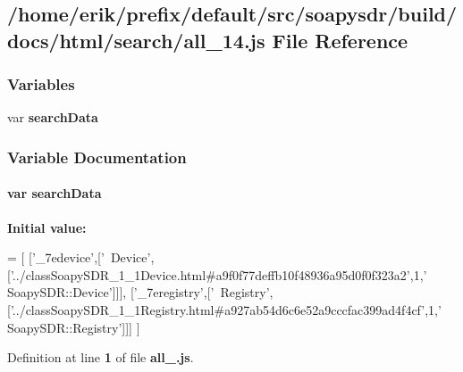 \subsection{/home/erik/prefix/default/src/soapysdr/build/docs/html/search/all\+\_\+14.js File Reference}
\label{all__14_8js}
\subsubsection*{Variables}
\begin{DoxyCompactItemize}
\item 
var {\bf search\+Data}
\end{DoxyCompactItemize}


\subsubsection{Variable Documentation}
\paragraph[{search\+Data}]{\setlength{\rightskip}{0pt plus 5cm}var search\+Data}\label{all__14_8js_ad01a7523f103d6242ef9b0451861231e}
{\bfseries Initial value\+:}
\begin{DoxyCode}
=
[
  [\textcolor{stringliteral}{'\_7edevice'},[\textcolor{stringliteral}{'~Device'},[\textcolor{stringliteral}{'../classSoapySDR\_1\_1Device.html#a9f0f77deffb10f48936a95d0f0f323a2'},1,\textcolor{stringliteral}{'
      SoapySDR::Device'}]]],
  [\textcolor{stringliteral}{'\_7eregistry'},[\textcolor{stringliteral}{'~Registry'},[\textcolor{stringliteral}{'../classSoapySDR\_1\_1Registry.html#a927ab54d6c6e52a9cccfac399ad4f4cf'},1,\textcolor{stringliteral}{'
      SoapySDR::Registry'}]]]
]
\end{DoxyCode}


Definition at line {\bf 1} of file {\bf all\+\_.\+js}.

